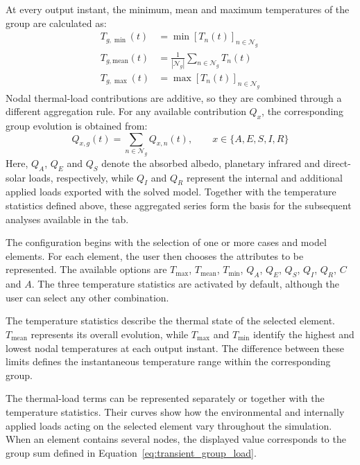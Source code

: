 At every output instant, the minimum, mean and maximum temperatures of the
group are calculated as:
\begin{align}
    T_{g,\min}(t)
    &=
    \min\!\left[ T_n(t) \right]_{n\in\mathcal{N}_g}
    \label{eq:transient_group_tmin}
    \\
    T_{g,\mathrm{mean}}(t)
    &=
    \frac{1}{|\mathcal{N}_g|}
    \sum_{n\in\mathcal{N}_g} T_n(t)
    \label{eq:transient_group_tmean}
    \\
    T_{g,\max}(t)
    &=
    \max\!\left[ T_n(t) \right]_{n\in\mathcal{N}_g}
    \label{eq:transient_group_tmax}
\end{align}
Nodal thermal-load contributions are additive, so they are combined through
a different aggregation rule. For any available contribution \(Q_x\), the
corresponding group evolution is obtained from:
\begin{equation}
    Q_{x,g}(t)
    =
    \sum_{n\in\mathcal{N}_g} Q_{x,n}(t),
    \qquad
    x\in\{A,E,S,I,R\}
    \label{eq:transient_group_load}
\end{equation}
Here, \(Q_A\), \(Q_E\) and \(Q_S\) denote the absorbed albedo, planetary
infrared and direct-solar loads, respectively, while \(Q_I\) and \(Q_R\)
represent the internal and additional applied loads exported with the solved
model. Together with the temperature statistics defined above, these aggregated
series form the basis for the subsequent analyses available in
the tab.

The configuration begins with the selection of one or more cases and model
elements. For each element, the user then chooses the attributes to be
represented. The available options are \(T_{\max}\), \(T_{\mathrm{mean}}\),
\(T_{\min}\), \(Q_A\), \(Q_E\), \(Q_S\), \(Q_I\), \(Q_R\), \(C\) and
\(A\). The three temperature statistics are activated by default, although 
the user can select any other combination.

The temperature statistics describe the thermal state of the selected
element. \(T_{\mathrm{mean}}\) represents its overall evolution, while
\(T_{\max}\) and \(T_{\min}\) identify the highest and lowest nodal
temperatures at each output instant. The difference between these limits
defines the instantaneous temperature range within the corresponding group.

The thermal-load terms can be represented separately or together with the
temperature statistics. Their curves show how the environmental and
internally applied loads acting on the selected element vary throughout the
simulation. When an element contains several nodes, the displayed value
corresponds to the group sum defined in
Equation~\eqref{eq:transient_group_load}.

